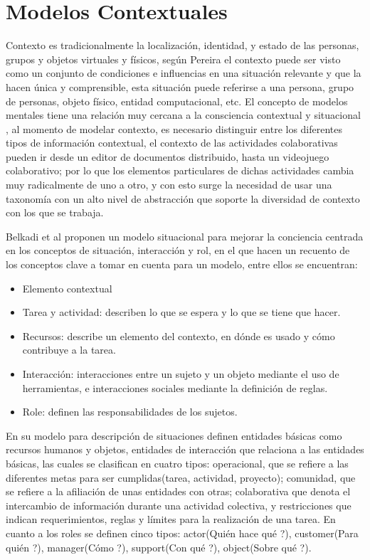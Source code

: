 \section{Modelos Contextuales}

Contexto es tradicionalmente la localizaci\'on, identidad, y estado de las personas, grupos y objetos virtuales y f\'isicos, seg\'un Pereira  \cite{pereira2013CSCWD} el contexto puede ser visto como un conjunto de condiciones e influencias en una situaci\'on relevante y que la hacen \'unica y comprensible, esta situaci\'on puede referirse a una persona, grupo de personas, objeto f\'isico, entidad computacional, etc. El concepto de modelos mentales tiene una relaci\'on muy cercana a la consciencia contextual y situacional \cite{aehnelt2012discussion}, al momento de modelar contexto, es necesario distinguir entre los diferentes tipos de informaci\'on contextual\cite{hoyos2013domain}, el contexto de las actividades colaborativas pueden ir desde un editor de documentos distribuido, hasta un videojuego colaborativo; por lo que los elementos particulares de dichas actividades cambia muy radicalmente de uno a otro, y con esto surge la necesidad de usar una taxonom\'ia con un alto nivel de abstracci\'on que soporte la diversidad de contexto con los que se trabaja.

Belkadi et al \cite{Belkadi2013110} proponen un modelo situacional para mejorar la conciencia centrada en los conceptos de situaci\'on, interacci\'on y rol, en el que hacen un recuento de los conceptos clave a tomar en cuenta para un modelo, entre ellos se encuentran: 
\begin{itemize}
\item Elemento contextual
\item Tarea y actividad: describen lo que se espera y lo que se tiene que hacer.
\item Recursos: describe un elemento del contexto, en d\'onde es usado y c\'omo contribuye a la tarea.
\item Interacci\'on: interacciones entre un sujeto y un objeto mediante el uso de herramientas, e interacciones sociales mediante la definici\'on de reglas.
\item Role: definen las responsabilidades de los sujetos.
\end{itemize}

En su modelo para descripci\'on de situaciones definen entidades b\'asicas como recursos humanos y objetos, entidades de interacci\'on que relaciona a las entidades b\'asicas, las cuales se clasifican en cuatro tipos: operacional, que se refiere a las diferentes metas para ser cumplidas(tarea, actividad, proyecto); comunidad, que se refiere a la afiliaci\'on de unas entidades con otras; colaborativa que denota el intercambio de informaci\'on durante una actividad colectiva, y restricciones que indican requerimientos, reglas y l\'imites para la realizaci\'on de una tarea. En cuanto a los roles se definen cinco tipos: actor(\textquestiondown Qui\'en hace qu\'e ?), customer(\textquestiondown Para qui\'en ?), manager(\textquestiondown C\'omo ?), support(\textquestiondown Con qu\'e ?), object(\textquestiondown Sobre qu\'e ?).

